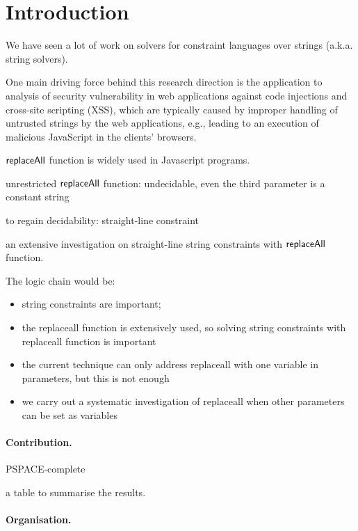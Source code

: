 
\section{Introduction}

We have seen  a lot of work on solvers for constraint languages over strings (a.k.a. string solvers). 

One main driving force behind this research direction is the application to analysis of security vulnerability in web applications against code injections and cross-site scripting (XSS), which are typically caused by improper handling of untrusted strings by the web applications, e.g., leading to an execution of malicious JavaScript in the clients' browsers. 

$\mathsf{replaceAll}$ function is widely used in Javascript programs.



\cite{LB16,TCJ16,YABI14}

unrestricted $\mathsf{replaceAll}$ function: undecidable, even the third parameter is a constant string

to regain decidability: straight-line constraint

an extensive investigation on straight-line string constraints with $\mathsf{replaceAll}$ function. 


The logic chain would be:
\begin{itemize}
	\item string constraints are important;
	\item the replaceall function is extensively used, so solving string constraints with replaceall function is important
	\item the current technique \cite{LB16} can only address replaceall with one variable in parameters, but this is not enough
	\item we carry out a systematic investigation of replaceall when other parameters can be set as variables 
\end{itemize}

\paragraph{Contribution.}

PSPACE-complete

a table to summarise the results.


\paragraph{Organisation.} 

